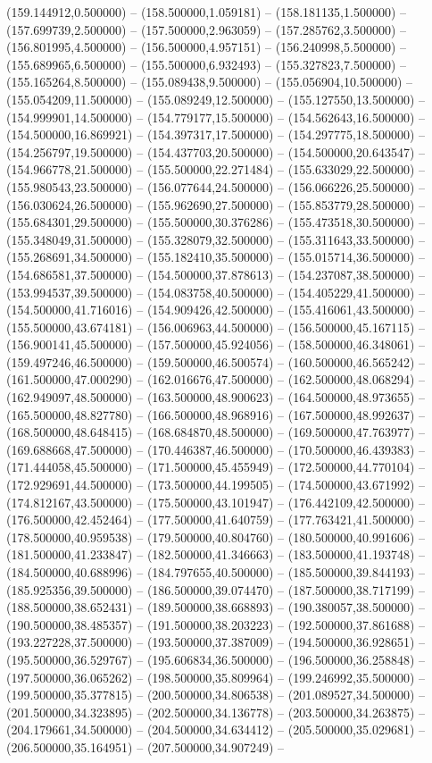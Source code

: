    (159.144912,0.500000) -- (158.500000,1.059181) -- (158.181135,1.500000) -- (157.699739,2.500000) -- (157.500000,2.963059) -- (157.285762,3.500000) -- (156.801995,4.500000) -- (156.500000,4.957151) -- (156.240998,5.500000) -- (155.689965,6.500000) -- (155.500000,6.932493) -- (155.327823,7.500000) -- (155.165264,8.500000) -- (155.089438,9.500000) -- (155.056904,10.500000) -- (155.054209,11.500000) -- (155.089249,12.500000) -- (155.127550,13.500000) -- (154.999901,14.500000) -- (154.779177,15.500000) -- (154.562643,16.500000) -- (154.500000,16.869921) -- (154.397317,17.500000) -- (154.297775,18.500000) -- (154.256797,19.500000) -- (154.437703,20.500000) -- (154.500000,20.643547) -- (154.966778,21.500000) -- (155.500000,22.271484) -- (155.633029,22.500000) -- (155.980543,23.500000) -- (156.077644,24.500000) -- (156.066226,25.500000) -- (156.030624,26.500000) -- (155.962690,27.500000) -- (155.853779,28.500000) -- (155.684301,29.500000) -- (155.500000,30.376286) -- (155.473518,30.500000) -- (155.348049,31.500000) -- (155.328079,32.500000) -- (155.311643,33.500000) -- (155.268691,34.500000) -- (155.182410,35.500000) -- (155.015714,36.500000) -- (154.686581,37.500000) -- (154.500000,37.878613) -- (154.237087,38.500000) -- (153.994537,39.500000) -- (154.083758,40.500000) -- (154.405229,41.500000) -- (154.500000,41.716016) -- (154.909426,42.500000) -- (155.416061,43.500000) -- (155.500000,43.674181) -- (156.006963,44.500000) -- (156.500000,45.167115) -- (156.900141,45.500000) -- (157.500000,45.924056) -- (158.500000,46.348061) -- (159.497246,46.500000) -- (159.500000,46.500574) -- (160.500000,46.565242) -- (161.500000,47.000290) -- (162.016676,47.500000) -- (162.500000,48.068294) -- (162.949097,48.500000) -- (163.500000,48.900623) -- (164.500000,48.973655) -- (165.500000,48.827780) -- (166.500000,48.968916) -- (167.500000,48.992637) -- (168.500000,48.648415) -- (168.684870,48.500000) -- (169.500000,47.763977) -- (169.688668,47.500000) -- (170.446387,46.500000) -- (170.500000,46.439383) -- (171.444058,45.500000) -- (171.500000,45.455949) -- (172.500000,44.770104) -- (172.929691,44.500000) -- (173.500000,44.199505) -- (174.500000,43.671992) -- (174.812167,43.500000) -- (175.500000,43.101947) -- (176.442109,42.500000) -- (176.500000,42.452464) -- (177.500000,41.640759) -- (177.763421,41.500000) -- (178.500000,40.959538) -- (179.500000,40.804760) -- (180.500000,40.991606) -- (181.500000,41.233847) -- (182.500000,41.346663) -- (183.500000,41.193748) -- (184.500000,40.688996) -- (184.797655,40.500000) -- (185.500000,39.844193) -- (185.925356,39.500000) -- (186.500000,39.074470) -- (187.500000,38.717199) -- (188.500000,38.652431) -- (189.500000,38.668893) -- (190.380057,38.500000) -- (190.500000,38.485357) -- (191.500000,38.203223) -- (192.500000,37.861688) -- (193.227228,37.500000) -- (193.500000,37.387009) -- (194.500000,36.928651) -- (195.500000,36.529767) -- (195.606834,36.500000) -- (196.500000,36.258848) -- (197.500000,36.065262) -- (198.500000,35.809964) -- (199.246992,35.500000) -- (199.500000,35.377815) -- (200.500000,34.806538) -- (201.089527,34.500000) -- (201.500000,34.323895) -- (202.500000,34.136778) -- (203.500000,34.263875) -- (204.179661,34.500000) -- (204.500000,34.634412) -- (205.500000,35.029681) -- (206.500000,35.164951) -- (207.500000,34.907249) -- 